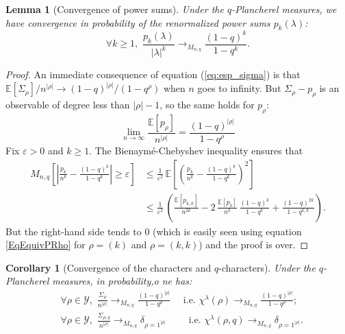 \documentclass[10pt]{amsart}
\newtheorem{corollary}[theorem]{Corollary}
\newtheorem{lemma}[theorem]{Lemma}
\theoremstyle{remark}
\newcommand{\young}{\mathscr{Y}}
\newcommand{\esper}{\mathbb{E}}
\newcommand{\eps}{\varepsilon}
\begin{document}
\begin{lemma}[Convergence of power sums]\label{lem:cv_powersums}
Under the $q$-Plancherel measures, we have convergence in probability of the renormalized power sums $p_k(\lambda)$:
$$\forall k \geq 1,\,\,\frac{p_k(\lambda)}{|\lambda|^k} \longrightarrow_{M_{n,q}} \frac{(1-q)^k}{1-q^k}.$$
\end{lemma}
\begin{proof}
An immediate consequence of equation (\ref{eq:esp_sigma}) is that $\esper[\varSigma_\rho]/n^{|\rho|} \to(1-q)^{|\rho|}/(1-q^\rho)$ when $n$ goes to infinity. But $\varSigma_\rho-p_\rho$ is an observable of degree less than $|\rho|-1$, so the same holds for $p_\rho$:
\begin{equation}\label{EqEquivPRho}
\lim_{n \to \infty} \frac{\esper[p_\rho]}{n^{|\rho|}} = \frac{(1-q)^{|\rho|}}{1-q^\rho}
\end{equation}
Fix $\eps>0$ and $k \geq 1$. The Bienaym\'e-Chebyshev inequality ensures that
\begin{align*}M_{n,q}\left[\left|\frac{p_k}{n^k} - \frac{(1-q)^k}{1-q^k}\right|\geq \eps\right] &\leq\frac{1}{\eps^2}\,\esper\left[\left(\frac{p_k}{n^k} - \frac{(1-q)^k}{1-q^k}\right)^2\right]\\
&\leq\frac{1}{\eps^2}\,\left(\frac{\esper[p_{k,k}]}{n^{2k}} - 2 \,\frac{\esper[p_k]}{n^k}\,\frac{(1-q)^k}{1-q^k} +\frac{(1-q)^{2k}}{1-q^{k,k}}\right).
\end{align*}
But the right-hand side tends to $0$ (which is easily seen using equation \eqref{EqEquivPRho} for $\rho=(k)$ and $\rho=(k,k)$) and the proof is over.
\end{proof} \bigskip


\begin{corollary}[Convergence of the characters and $q$-characters]\label{corol:concentration_q-characters}
Under the $q$-Plancherel measures, in probability,o ne has:
\begin{align*}
 &\forall \rho \in \young, \,\, \frac{\varSigma_\rho}{n^{|\rho|}}  \longrightarrow_{M_{n,q}} \frac{(1-q)^{|\rho|}}{1-q^\rho}\quad   \text{  i.e. } \chi^\lambda(\rho)  \longrightarrow_{M_{n,q}} \frac{(1-q)^{|\rho|}}{1-q^\rho};\\ 
& \forall \rho \in \young,  \,\, \frac{\varSigma_{\rho,q}}{n^{|\rho|}}  \longrightarrow_{M_{n,q}} \delta_{\rho=1^{|\rho|}}\quad \quad  \text{ i.e. } \chi^\lambda(\rho,q)  \longrightarrow_{M_{n,q}}\delta_{\rho=1^{|\rho|}}.
\end{align*}
\end{corollary}
\end{document}
